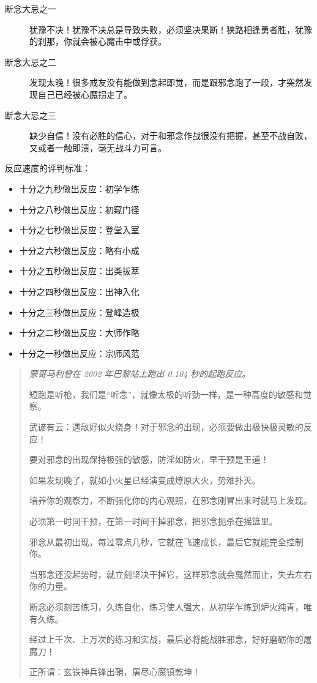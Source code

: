 \begin{description}
    \item[断念大忌之一] 犹豫不决！犹豫不决总是导致失败，必须坚决果断！狭路相逢勇者胜，犹豫的刹那，你就会被心魔击中或俘获。
    \item[断念大忌之二] 发现太晚！很多戒友没有能做到念起即觉，而是跟邪念跑了一段，才突然发现自己已经被心魔拐走了。
    \item[断念大忌之三] 缺少自信！没有必胜的信心，对于和邪念作战很没有把握，甚至不战自败，又或者一触即溃，毫无战斗力可言。
\end{description}

反应速度的评判标准：

\begin{multicols}{2}
    \begin{itemize}
        \item 十分之九秒做出反应：初学乍练
        \item 十分之八秒做出反应：初窥门径
        \item 十分之七秒做出反应：登堂入室
        \item 十分之六秒做出反应：略有小成
        \item 十分之五秒做出反应：出类拔萃
        \item 十分之四秒做出反应：出神入化
        \item 十分之三秒做出反应：登峰造极
        \item 十分之二秒做出反应：大师作略
        \item 十分之一秒做出反应：宗师风范
    \end{itemize}
\end{multicols}

\begin{quotation}\it
    蒙哥马利曾在 2002 年巴黎站上跑出 0.104 秒的起跑反应。

    短跑是听枪，我们是“听念”，就像太极的听劲一样，是一种高度的敏感和觉察。

    武谚有云：遇敌好似火烧身！对于邪念的出现，必须要做出极快极灵敏的反应！

    要对邪念的出现保持极强的敏感，防淫如防火，早干预是王道！

    如果发现晚了，就如小火星已经演变成燎原大火，势难扑灭。

    培养你的观察力，不断强化你的内心观照，在邪念刚冒出来时就马上发现。

    必须第一时间干预，在第一时间干掉邪念，把邪念扼杀在摇篮里。

    邪念从最初出现，每过零点几秒，它就在飞速成长，最后它就能完全控制你。

    当邪念还没起势时，就立刻坚决干掉它，这样邪念就会戛然而止，失去左右你的力量。

    断念必须刻苦练习，久练自化，练习使人强大，从初学乍练到炉火纯青，唯有久练。

    经过上千次、上万次的练习和实战，最后必将能战胜邪念，好好磨砺你的屠魔刀！

    正所谓：玄铁神兵锋出鞘，屠尽心魔镇乾坤！
\end{quotation}

